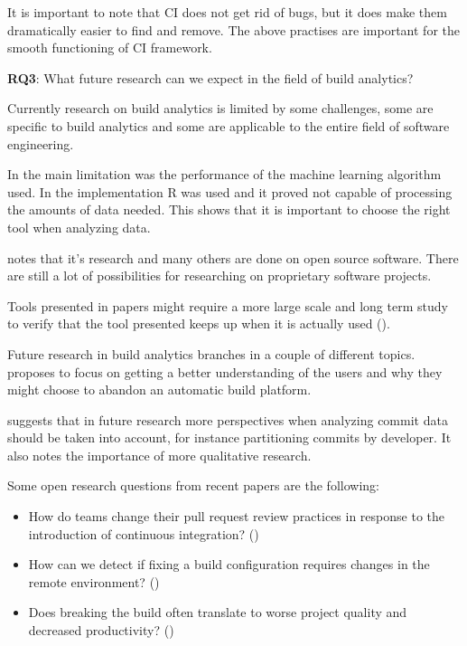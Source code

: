 \documentclass[]{book}
\providecommand{\tightlist}{%
  \setlength{\itemsep}{0pt}\setlength{\parskip}{0pt}}
\begin{document}
It is important to note that CI does not get rid of bugs, but it does
make them dramatically easier to find and remove. The above practises
are important for the smooth functioning of CI framework.

\textbf{RQ3}: What future research can we expect in the field of build
analytics?

Currently research on build analytics is limited by some challenges,
some are specific to build analytics and some are applicable to the
entire field of software engineering.

In \citet{bisong2017built} the main limitation was the performance of
the machine learning algorithm used. In the implementation R was used
and it proved not capable of processing the amounts of data needed. This
shows that it is important to choose the right tool when analyzing data.

\citet{pinto2018work} notes that it's research and many others are done
on open source software. There are still a lot of possibilities for
researching on proprietary software projects.

Tools presented in papers might require a more large scale and long term
study to verify that the tool presented keeps up when it is actually
used (\citet{santolucito2018statically}).

Future research in build analytics branches in a couple of different
topics. \citet{pinto2018work} proposes to focus on getting a better
understanding of the users and why they might choose to abandon an
automatic build platform.

\citet{baltes2018no} suggests that in future research more perspectives
when analyzing commit data should be taken into account, for instance
partitioning commits by developer. It also notes the importance of more
qualitative research.

Some open research questions from recent papers are the following:

\begin{itemize}
\tightlist
\item
  How do teams change their pull request review practices in response to
  the introduction of continuous integration? (\citet{zhao2017impact})
\item
  How can we detect if fixing a build configuration requires changes in
  the remote environment? (\citet{vassallo2018break})
\item
  Does breaking the build often translate to worse project quality and
  decreased productivity? (\citet{beller2017oops})
\end{itemize}
\end{document}
